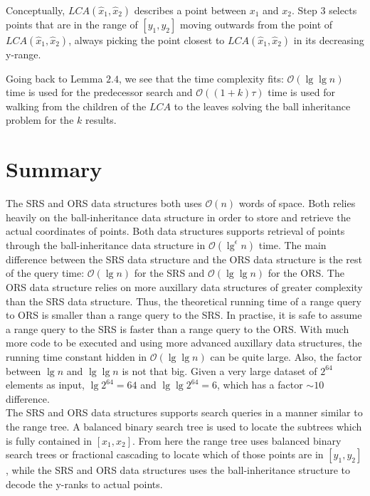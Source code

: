 Conceptually, $LCA(\hat{x}_1, \hat{x}_2)$ describes a point between $x_1$ and $x_2$. Step $3$ selects points that are in the range of $[y_1, y_2]$ moving outwards from the point of $LCA(\hat{x}_1, \hat{x}_2)$, always picking the point closest to $LCA(\hat{x}_1, \hat{x}_2)$ in its decreasing y-range. 

Going back to Lemma $2.4$, we see that the time complexity fits: $\mathcal{O}(\lg \lg n)$ time is used for the predecessor search and $\mathcal{O}((1+k)\tau)$ time is used for walking from the children of the $LCA$ to the leaves solving the ball inheritance problem for the $k$ results.

\section{Summary}
\label{sect:summaryprim}

The SRS and ORS data structures both uses $\mathcal{O}(n)$ words of space. Both relies heavily on the ball-inheritance data structure in order to store and retrieve the actual coordinates of points. Both data structures supports retrieval of points through the ball-inheritance data structure in $\mathcal{O}(\lg^\epsilon n)$ time. The main difference between the SRS data structure and the ORS data structure is the rest of the query time: $\mathcal{O}(\lg n)$ for the SRS and $\mathcal{O}(\lg \lg n)$ for the ORS. The ORS data structure relies on more auxillary data structures of greater complexity than the SRS data structure. Thus, the theoretical running time of a range query to ORS is smaller than a range query to the SRS. In practise, it is safe to assume a range query to the SRS is faster than a range query to the ORS. With much more code to be executed and using more advanced auxillary data structures, the running time constant hidden in $\mathcal{O}(\lg \lg n)$ can be quite large. Also,  the factor between $\lg n$ and $\lg \lg n$ is not that big. Given a very large dataset of $2^{64}$ elements as input, $\lg 2^{64} = 64$ and $\lg \lg 2^{64} = 6$, which has a factor $\sim10$ difference. \\

The SRS and ORS data structures supports search queries in a manner similar to the range tree. A balanced binary search tree is used to locate the subtrees which is fully contained in $[x_1, x_2]$. From here the range tree uses balanced binary search trees or fractional cascading to locate which of those points are in $[y_1, y_2]$, while the SRS and ORS data structures uses the ball-inheritance structure to decode the y-ranks to actual points. \\

